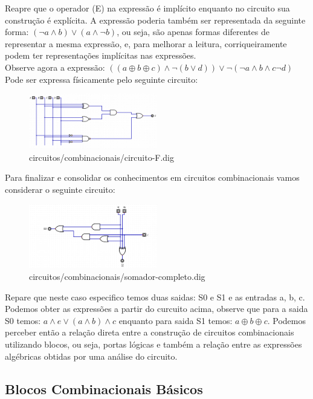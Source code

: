 \documentclass[12pt, onecolumn]{article}
\begin{document}
	Reapre que o operador (E) na expressão é implícito enquanto no circuito
	sua construção é explícita. A expressão poderia também ser representada 
	da seguinte forma: $(\lnot{a} \land b) \lor (a \land \lnot{b})$, ou seja,
	são apenas formas diferentes de representar a mesma expressão, e, para
	melhorar a leitura, corriqueiramente podem ter representações implícitas
	nas expressões. \\
	\newline
	Observe agora a expressão: 
	$ ((a \oplus b \oplus c) \land \lnot{(b \lor d)}) \lor 
	\lnot{(\lnot{a} \land b \land c \lnot{d})} $ \\
	\newline
	Pode ser expressa físicamente pelo seguinte circuito:
	\begin{figure}[h]
		\centering
		\caption{circuitos/combinacionais/circuito-F.dig}
		\includegraphics[width=0.5\textwidth]{img/circuito-F.png}
	\end{figure}
	
	Para finalizar e consolidar os conhecimentos em circuitos combinacionais
	vamos considerar o seguinte circuito:
	\begin{figure}[h]
		\centering
		\caption{circuitos/combinacionais/somador-completo.dig}
		\includegraphics[width=0.5\textwidth]{img/somador.png}
	\end{figure}
	Repare que neste caso especifico temos duas saidas: S0 e S1
	e as entradas a, b, c.
	\newline
	Podemos obter as expressões a partir do curcuito acima, observe que
	para a saida S0 temos: $a \land e \lor (a \land b) \land c$ enquanto
	para saida S1 temos: $a \oplus b \oplus c$. 
	\newline
	Podemos perceber então a relação direta entre a construção de circuitos
	combinacionais utilizando blocos, ou seja, portas lógicas e também 
	a relação entre as expressões algébricas obtidas por uma análise 
	do circuito.

	\subsection{\centering Blocos Combinacionais Básicos}





	
        
\end{document}
